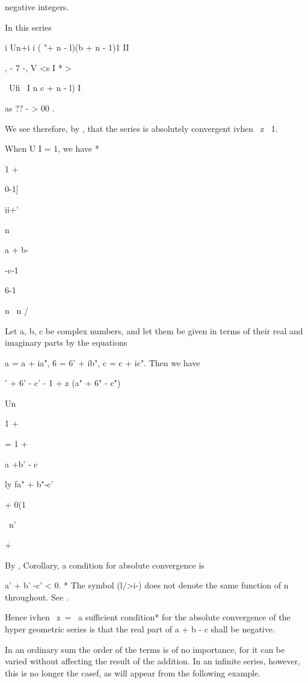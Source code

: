 negative integers.

  In this series

i Un+i i ( "+ n - l)(b + n - 1)1 II

, - 7 -, V <s I * >

\ Ufi \ I n c + n - l) I

as ?? - > 00 .

We see therefore, by , that the series is absolutely convergent
ivhen \ z\ < l, and divergent ivhen | | > 1.

When U I = 1, we have *

1 +

0-1]

ii+'

n

a + b-

-c-1

6-1

n \ n /

Let a, b, c be complex numbers, and let them be given in terms of
their real and imaginary parts by the equations

a = a + ia", 6 = 6' + ib", c = c + ic". Then we have

 ' + 6' - c' - 1 + z (a" + 6" - c")

Un

1 +

= 1 +

a +b' - c

ly fa" + b"-c'

+ 0(1

\ n'

+



By , Corollary, a condition for absolute convergence is

a' + b' -c' < 0. * The symbol (l/>i-) does not denote the same
function of n throughout. See .

%
%

Hence ivhen \ z\ = \, a sufficient condition* for the absolute
convergence of the hyper geometric series is that the real part of a +
b - c shall be negative.


In an ordinary sum the order of the terms is of no importance, for it
can be varied without affecting the result of the addition. In an
infinite series, however, this is no longer the casef, as will appear
from the following example.


